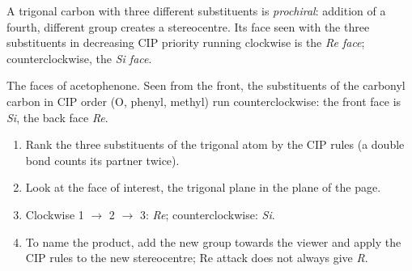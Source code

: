 \begin{definition}\label{def:b3:asymmetric-synthesis:faces}
A trigonal carbon with three different substituents is \emph{prochiral}:
addition of a fourth, different group creates a stereocentre. Its face seen with
the three substituents in decreasing CIP priority running clockwise is the
\emph{Re face}; counterclockwise, the \emph{Si face}.
\end{definition}

\begin{omfigure}

{\small The faces of acetophenone. Seen from the front, the substituents of the
carbonyl carbon in CIP order (O, phenyl, methyl) run counterclockwise: the front
face is \textit{Si}, the back face \textit{Re}.}
\end{omfigure}

\begin{method}\label{met:b3:asymmetric-synthesis:re-si}
\begin{enumerate}
  \item Rank the three substituents of the trigonal atom by the CIP rules (a
        double bond counts its partner twice).
  \item Look at the face of interest, the trigonal plane in the plane of the page.
  \item Clockwise 1 $\to$ 2 $\to$ 3: \textit{Re}; counterclockwise: \textit{Si}.
  \item To name the product, add the new group towards the viewer and apply the
        CIP rules to the new stereocentre; Re attack does not always give \textit{R}.
\end{enumerate}
\end{method}

